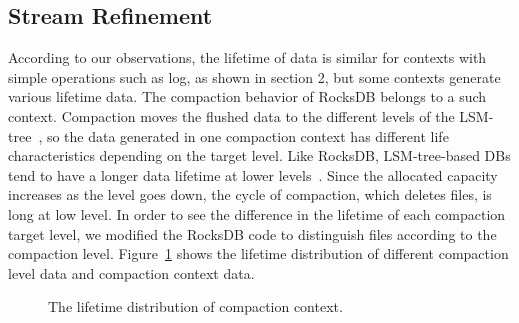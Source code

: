\vspace{-5pt}
\subsection{Stream Refinement}
According to our observations, the lifetime of data is similar 
for contexts with simple operations such as log, as shown in section 2, 
but some contexts generate various lifetime data.
The compaction behavior of RocksDB belongs to a such context.
Compaction moves the flushed data to the different levels
of the LSM-tree~\cite{RocksDB}, 
so the data generated in one compaction context has 
different life characteristics depending on the target level.
Like RocksDB, LSM-tree-based DBs tend to have a longer 
data lifetime at lower levels~\cite{Level}.
Since the allocated capacity increases as the level goes down, 
the cycle of compaction, which deletes files, is long at low level.
In order to see the difference in the lifetime of each compaction target level,
we modified the RocksDB code to distinguish files according to the compaction level.
Figure~\ref{fig:compaction} shows the lifetime distribution of 
different compaction level data and compaction context data.

\begin{figure}[!t]
\centering
\hspace{1pt}
\hfill
\vspace{-10pt}
\vspace{-10pt}
\caption{The lifetime distribution of compaction context.} 
\label{fig:compaction}
\vspace{-25pt}
\end{figure}

